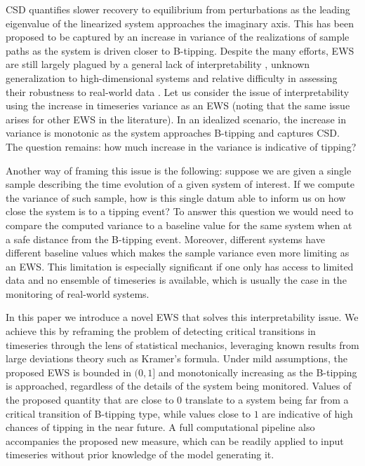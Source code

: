 \documentclass[10pt]{article}
\begin{document}
CSD quantifies slower recovery to equilibrium from perturbations as the leading eigenvalue of the linearized system approaches the imaginary axis.
This has been proposed to be captured by an increase in variance of the realizations of sample paths as the system is driven closer to B-tipping.
Despite the many efforts, EWS are still largely plagued by a general lack of interpretability \cite{Ditlevsen2010, Donovan2026}, unknown generalization to high-dimensional systems \cite{Robinson2025} and relative difficulty in assessing their robustness to real-world data \cite{Dakos2012, Ashwin2025}.
Let us consider the issue of interpretability using the increase in timeseries variance as an EWS (noting that the same issue arises for other EWS in the literature).
In an idealized scenario, the increase in variance is monotonic as the system approaches B-tipping and captures CSD. The question remains: how much increase in the variance is indicative of tipping?

Another way of framing this issue is the following: suppose we are given a single sample describing the time evolution of a given system of interest.
If we compute the variance of such sample, how is this single datum able to inform us on how close the system is to a tipping event?
To answer this question we would need to compare the computed variance to a baseline value for the same system when at a safe distance from the B-tipping event.
Moreover, different systems have different baseline values which makes the sample variance even more limiting as an EWS.
This limitation is especially significant if one only has access to limited data and no ensemble of timeseries is available, which is usually the case in the monitoring of real-world systems.

In this paper we introduce a novel EWS that solves this interpretability issue. 
We achieve this by reframing the problem of detecting critical transitions in timeseries through the lens of statistical mechanics, leveraging known results from large deviations theory such as Kramer's formula.
Under mild assumptions, the proposed EWS is bounded in $(0,1]$ and monotonically increasing as the B-tipping is approached, regardless of the details of the system being monitored. 
Values of the proposed quantity that are close to $0$ translate to a system being far from a critical transition of B-tipping type, while values close to $1$ are indicative of high chances of tipping in the near future.
A full computational pipeline also accompanies the proposed new measure, which can be readily applied to input timeseries without prior knowledge of the model generating it.
\end{document}
